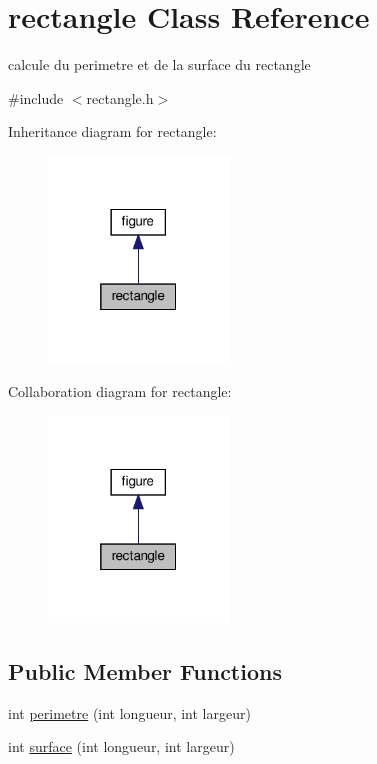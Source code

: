 \hypertarget{classrectangle}{}\section{rectangle Class Reference}
\label{classrectangle}


calcule du perimetre et de la surface du rectangle  




{\ttfamily \#include $<$rectangle.\+h$>$}



Inheritance diagram for rectangle\+:
\nopagebreak
\begin{figure}[H]
\begin{center}
\leavevmode
\includegraphics[width=136pt]{classrectangle__inherit__graph}
\end{center}
\end{figure}


Collaboration diagram for rectangle\+:
\nopagebreak
\begin{figure}[H]
\begin{center}
\leavevmode
\includegraphics[width=136pt]{classrectangle__coll__graph}
\end{center}
\end{figure}
\subsection*{Public Member Functions}
\begin{DoxyCompactItemize}
\item 
int \hyperlink{classrectangle_aa613ad02ccb6dac181af4da6582315e6}{perimetre} (int longueur, int largeur)
\item 
int \hyperlink{classrectangle_a5923870fc20835f463cde0f64023b042}{surface} (int longueur, int largeur)
\end{DoxyCompactItemize}


